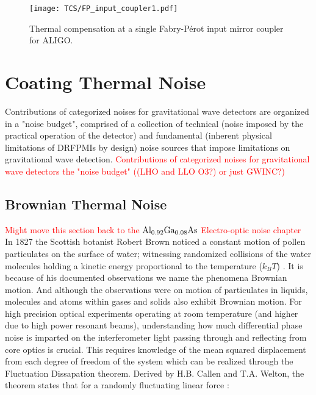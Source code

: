 \begin{figure}[H]
	\texttt{[image: TCS/FP\_input\_coupler1.pdf]}
\caption{Thermal compensation at a single Fabry-P\'{e}rot input mirror coupler for ALIGO.}
 \label{fig:meas}
\end{figure}

\section{Coating Thermal Noise}
Contributions of categorized noises for gravitational wave detectors are organized in a "noise budget", comprised of a collection of technical (noise imposed by the practical operation of the detector) and fundamental (inherent physical limitations of DRFPMIs by design) noise sources that impose limitations on gravitational wave detection.
\textcolor{red}{Contributions of categorized noises for gravitational wave detectors the "noise budget" ((LHO and LLO O3?) or just GWINC?)}

\subsection{Brownian Thermal Noise}
\textcolor{red}{Might move this section back to the $\mathrm{Al_{0.92}Ga_{0.08}As}$ Electro-optic noise chapter}
\\
In 1827 the Scottish botanist Robert Brown noticed a constant motion of pollen particulates on the surface of water; witnessing randomized collisions of the water molecules holding a kinetic energy proportional to the temperature ($k_BT$) \cite{Brown:1828}. It is because of his documented observations we name the phenomena Brownian motion. And although the observations were on motion of particulates in liquids, molecules and atoms within gases and solids also exhibit Brownian motion. For high precision optical experiments operating at room temperature (and higher due to high power resonant beams), understanding how much differential phase noise is imparted on the interferometer light passing through and reflecting from core optics is crucial. This requires knowledge of the mean squared displacement from each degree of freedom of the system which can be realized through the Fluctuation Dissapation theorem. Derived by H.B. Callen and T.A. Welton, the theorem states that for a randomly fluctuating linear force \cite{Callen:1951}:


